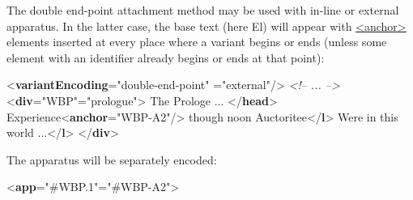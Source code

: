 The double end-point attachment method may be used with in-line or external apparatus. In the latter case, the base text (here El) will appear with \hyperref[TEI.anchor]{<anchor>} elements inserted at every place where a variant begins or ends (unless some element with an identifier already begins or ends at that point): \par\bgroup{}\exampleFont \begin{shaded}\noindent\mbox{}{<\textbf{variantEncoding}\hspace*{1em}{method}="{double-end-point}"\mbox{}\newline 
\hspace*{1em}{location}="{external}"/>}\mbox{}\newline 
\textit{<!-- ... -->}\mbox{}\newline 
{<\textbf{div}\hspace*{1em}{n}="{WBP}"\hspace*{1em}{type}="{prologue}">}\mbox{}\newline 
{}The Prologe ... {</\textbf{head}>}\mbox{}\newline 
{}Experience{<\textbf{anchor}\hspace*{1em}{xml:id}="{WBP-A2}"/>} though noon Auctoritee{</\textbf{l}>}\mbox{}\newline 
{}Were in this world ...{</\textbf{l}>}\mbox{}\newline 
{</\textbf{div}>}\end{shaded}\egroup\par \noindent  The apparatus will be separately encoded: \par\bgroup{}\exampleFont \begin{shaded}\noindent\mbox{}{<\textbf{app}\hspace*{1em}{from}="{\#WBP.1}"\hspace*{1em}{to}="{\#WBP-A2}">}\mbox{}\newline 

\end{shaded}
